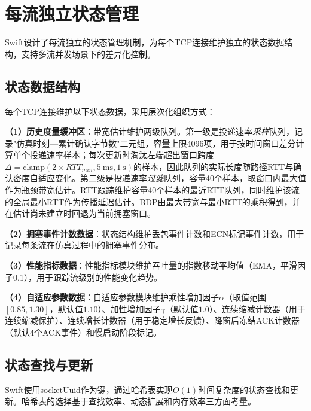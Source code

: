 \section{每流独立状态管理}

Swift设计了每流独立的状态管理机制，为每个TCP连接维护独立的状态数据结构，支持多流并发场景下的差异化控制。

\subsection{状态数据结构}

每个TCP连接维护以下状态数据，采用层次化组织方式：

\textbf{（1）历史度量缓冲区}：带宽估计维护两级队列。第一级是投递速率\emph{采样}队列，记录"仿真时刻—累计确认字节数"二元组，容量上限4096项，用于按时间窗口差分计算单个投递速率样本；每次更新时淘汰左端超出窗口跨度$\Delta = \mathrm{clamp}(2 \times RTT_{min}, 5~\text{ms}, 1~\text{s})$的样本，因此队列的实际长度随路径RTT与确认密度自适应变化。第二级是投递速率\emph{过滤}队列，容量40个样本，取窗口内最大值作为瓶颈带宽估计。RTT跟踪维护容量40个样本的最近RTT队列，同时维护该流的全局最小RTT作为传播延迟估计。BDP由最大带宽与最小RTT的乘积得到，并在估计尚未建立时回退为当前拥塞窗口。

\textbf{（2）拥塞事件计数数据}：状态结构维护丢包事件计数和ECN标记事件计数，用于记录每条流在仿真过程中的拥塞事件分布。

\textbf{（3）性能指标数据}：性能指标模块维护吞吐量的指数移动平均值（EMA，平滑因子0.1），用于跟踪流级别的性能变化趋势。

\textbf{（4）自适应参数数据}：自适应参数模块维护乘性增加因子$\alpha$（取值范围$[0.85, 1.30]$，默认值$1.10$）、加性增加因子$\gamma$（默认值$1.0$）、连续缩减计数器（用于连续缩减保护）、连续增长计数器（用于稳定增长反馈）、降窗后冻结ACK计数器（默认4个ACK事件）和慢启动阶段标记。

\subsection{状态查找与更新}

Swift使用socketUuid作为键，通过哈希表实现$O(1)$时间复杂度的状态查找和更新。哈希表的选择基于查找效率、动态扩展和内存效率三方面考量。

